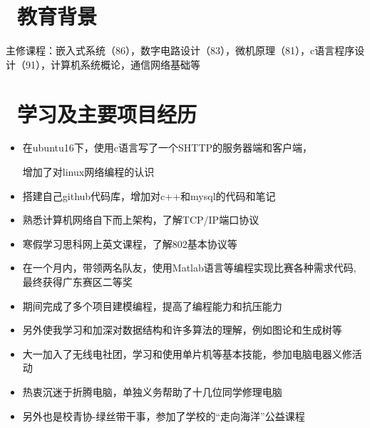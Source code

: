 \documentclass{resume}
\begin{document}

 
\section{\faGraduationCap\  教育背景}

主修课程：嵌入式系统（86），数字电路设计（83），{}{}微机原理（81），c语言程序设计（91），计算机系统概论，通信网络基础等
\section{\faUsers\ 学习及主要项目经历}
\begin{onehalfspacing}
\begin{itemize}
  \item 在ubuntu16下，使用c语言写了一个SHTTP的服务器端和客户端，
  
  增加了对linux网络编程的认识
  \item 搭建自己github代码库，增加对c++和mysql的代码和笔记
  \item 熟悉计算机网络自下而上架构，了解TCP/IP端口协议
  \item 寒假学习思科网上英文课程，了解802基本协议等
  
\end{itemize}

\begin{onehalfspacing}
\begin{itemize}
  \item 在一个月内，带领两名队友，使用Matlab语言等编程实现比赛各种需求代码,\\最终获得广东赛区二等奖
  \item 期间完成了多个项目建模编程，提高了编程能力和抗压能力
  \item 另外使我学习和加深对数据结构和许多算法的理解，例如图论和生成树等
\end{itemize}
\end{onehalfspacing}
\begin{itemize}
  \item 大一加入了无线电社团，学习和使用单片机等基本技能，参加电脑电器义修活动
  \item 热衷沉迷于折腾电脑，单独义务帮助了十几位同学修理电脑
  \item 另外也是校青协-绿丝带干事，参加了学校的“走向海洋”公益课程
\end{itemize}



\end{onehalfspacing}
\end{document}
